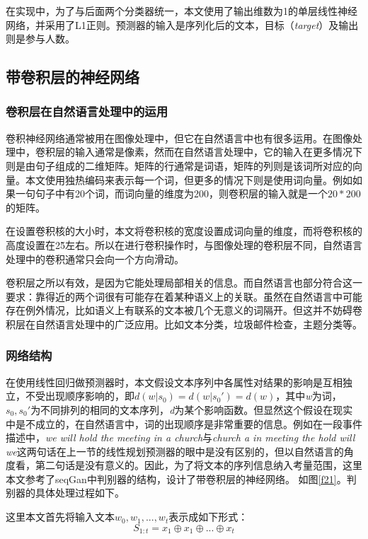 在实现中，为了与后面两个分类器统一，本文使用了输出维数为1的单层线性神经网络，并采用了L1正则。预测器的输入是序列化后的文本，目标（\textit{target}）及输出则是参与人数。


\subsection{带卷积层的神经网络}
\subsubsection{卷积层在自然语言处理中的运用}
卷积神经网络通常被用在图像处理中，但它在自然语言中也有很多运用。在图像处理中，卷积层的输入通常是像素，然而在自然语言处理中，它的输入在更多情况下则是由句子组成的二维矩阵。矩阵的行通常是词语，矩阵的列则是该词所对应的向量。本文使用独热编码来表示每一个词，但更多的情况下则是使用词向量。例如如果一句句子中有20个词，而词向量的维度为200，则卷积层的输入就是一个$20*200$的矩阵。

在设置卷积核的大小时，本文将卷积核的宽度设置成词向量的维度，而将卷积核的高度设置在2\~5左右。所以在进行卷积操作时，与图像处理的卷积层不同，自然语言处理中的卷积通常只会向一个方向滑动。

卷积层之所以有效，是因为它能处理局部相关的信息。而自然语言也部分符合这一要求：靠得近的两个词很有可能存在着某种语义上的关联。虽然在自然语言中可能存在例外情况，比如语义上有联系的文本被几个无意义的词隔开。但这并不妨碍卷积层在自然语言处理中的广泛应用。比如文本分类，垃圾邮件检查，主题分类等。
\subsubsection{网络结构}
在使用线性回归做预测器时，本文假设文本序列中各属性对结果的影响是互相独立，不受出现顺序影响的，即\(d(w|s_0)=d(w|s_0')=d(w)\)，其中\textit{w}为词，\(s_0,s_0'\)为不同排列的相同的文本序列，\textit{d}为某个影响函数。但显然这个假设在现实中是不成立的，在自然语言中，词的出现顺序是非常重要的信息。例如在一段事件描述中，\textit{we will hold the meeting in a church}与\textit{church a in meeting the hold will we}这两句话在上一节的线性规划预测器的眼中是没有区别的，但以自然语言的角度看，第二句话是没有意义的。因此，为了将文本的序列信息纳入考量范围，这里本文参考了seqGan\cite{yu_seqgan:_2016}中判别器的结构，设计了带卷积层的神经网络。
如图\ref{f21}。判别器的具体处理过程如下。

这里本文首先将输入文本\(w_0,w_1,...,w_t\)表示成如下形式：
\begin{equation}
S_{1:t}=x_1\oplus x_1\oplus...\oplus x_t
\end{equation}

